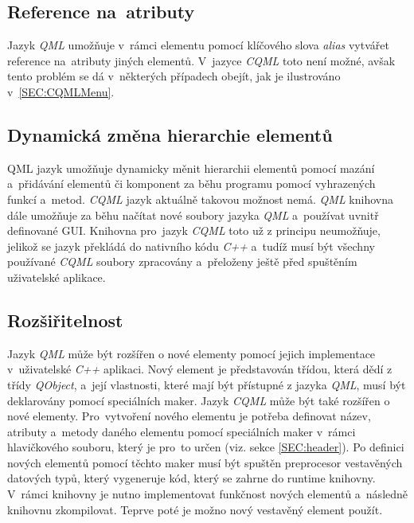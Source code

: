\documentclass[11pt,twoside,a4paper]{book}
\begin{document}
\subsection{Reference na~atributy}
Jazyk \textit{QML} umožňuje v~rámci elementu pomocí klíčového slova \textit{alias} vytvářet reference na~atributy jiných elementů. V~jazyce \textit{CQML} toto není možné, avšak tento problém se dá v~některých případech obejít, jak je ilustrováno v~\ref{SEC:CQMLMenu}.
\subsection{Dynamická změna hierarchie elementů}
QML jazyk umožňuje dynamicky měnit hierarchii elementů pomocí mazání a~přidávání elementů či komponent za běhu programu pomocí vyhrazených funkcí a~metod. \textit{CQML} jazyk aktuálně takovou možnost nemá. \textit{QML} knihovna dále umožňuje za běhu načítat nové soubory jazyka \textit{QML} a~používat uvnitř definované GUI. Knihovna pro~jazyk \textit{CQML} toto už z principu neumožňuje, jelikož se jazyk překládá do nativního kódu \textit{C++} a~tudíž musí být všechny používané \textit{CQML} soubory zpracovány a~přeloženy ještě před spuštěním uživatelské aplikace.
\subsection{Rozšiřitelnost}
Jazyk \textit{QML} může být rozšířen o nové elementy pomocí jejich implementace v~uživatelské \textit{C++} aplikaci. Nový element je představován třídou, která dědí z třídy \textit{QObject}, a~její vlastnosti, které mají být přístupné z jazyka \textit{QML}, musí být deklarovány pomocí speciálních maker. 
Jazyk \textit{CQML} může být také rozšířen o nové elementy. Pro~vytvoření nového elementu je potřeba definovat název, atributy a~metody daného elementu pomocí speciálních maker v~rámci hlavičkového souboru, který je pro~to určen (viz. sekce \ref{SEC:header}). Po definici nových elementů pomocí těchto maker musí být spuštěn preprocesor vestavěných datových typů, který vygeneruje kód, který se zahrne do runtime knihovny. V~rámci knihovny je nutno implementovat funkčnost nových elementů a~následně knihovnu zkompilovat. Teprve poté je možno nový vestavěný element použít.
\end{document}
